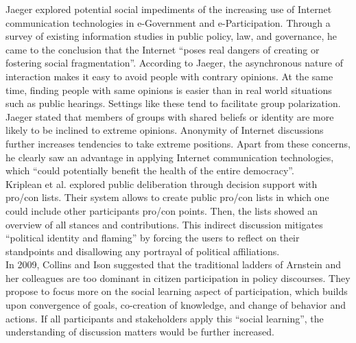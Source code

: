 Jaeger \cite{Jaeger2005_deliberate_democracy_and_egovernment} explored potential social impediments of the increasing use of Internet communication technologies in e-Government and e-Participation. Through a survey of existing information studies in public policy, law, and governance, he came to the conclusion that the Internet ``poses real dangers of creating or fostering social fragmentation''. According to Jaeger, the asynchronous nature of interaction makes it easy to avoid people with contrary opinions. At the same time, finding people with same opinions is easier than in real world situations such as public hearings. Settings like these tend to facilitate group polarization. Jaeger stated that members of groups with shared beliefs or identity are more likely to be inclined to extreme opinions. Anonymity of Internet discussions further increases tendencies to take extreme positions. Apart from these concerns, he clearly saw an advantage in applying Internet communication technologies, which ``could potentially benefit the health of the entire democracy''.\\
Kriplean et al. \cite{Kriplean2012_Considerit} explored public deliberation through decision support with pro/con lists. Their system allows to create public pro/con lists in which one could include other participants pro/con points. Then, the lists showed an overview of all stances and contributions. This indirect discussion mitigates ``political identity and flaming'' by forcing the users to reflect on their standpoints and disallowing any portrayal of political affiliations.\\
In 2009, Collins and Ison \cite{Collins2009_social_learning} suggested that the traditional ladders of Arnstein and her colleagues are too dominant in citizen participation in policy discourses. They propose to focus more on the social learning aspect of participation, which builds upon convergence of goals, co-creation of knowledge, and change of behavior and actions. If all participants and stakeholders apply this ``social learning'', the understanding of discussion matters would be further increased.%
